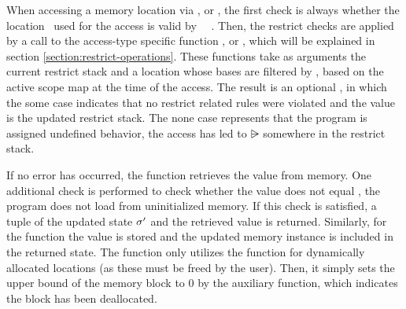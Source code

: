 When accessing a memory location via ,  or , the first check is always whether the location
\Simplelocvar \ used for the access is valid by \Memvar \ \validsym \ \Simplelocvar.
Then, the restrict checks are applied by a call to the access-type specific function ,  or ,
which will be explained in section \ref{section:restrict-operations}.
These functions take as arguments the current restrict stack and a location whose bases are filtered by \filterinactive,
based on the active scope map at the time of the access.
The result is an optional \Restrictstack, in which the some case indicates that no restrict related rules were violated and the
value is the updated restrict stack. The none case represents that the program is assigned undefined behavior, \ie the access has led to
$\rsub$ somewhere in the restrict stack.

If no error has occurred, the  function retrieves the value from memory.
One additional check is performed to check whether the value does not equal \vundef, \ie the program does not load from uninitialized memory.
If this check is satisfied, a tuple of the updated state $\sigma'$ and the retrieved value is returned.
Similarly, for the  function the value is stored and the updated memory instance is included in the returned state.
The  function only utilizes the  function for dynamically allocated locations (as these must be freed by the user).
Then, it simply sets the upper bound of the memory block to 0 by the auxiliary  function, which indicates the block has been deallocated.

